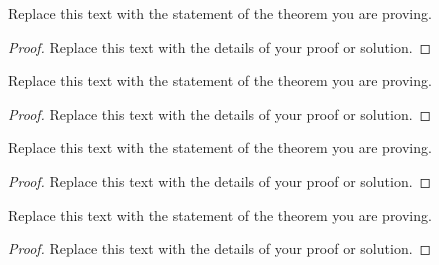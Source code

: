 \documentclass{article}
\newenvironment{problem}[2][Problem]{\begin{trivlist}
\item[\hskip \labelsep {\bfseries #1}\hskip \labelsep {\bfseries #2.}]}{\end{trivlist}}
\begin{document}

\vspace{0.25in} %

\begin{problem}{7}
Replace this text with the statement of the theorem you are proving.
\end{problem}

\begin{proof}
Replace this text with the details of your proof or solution.
\end{proof}


\vspace{0.25in} %

\begin{problem}{8}
Replace this text with the statement of the theorem you are proving.
\end{problem}

\begin{proof}
Replace this text with the details of your proof or solution.
\end{proof}


\vspace{0.25in} %

\begin{problem}{9}
Replace this text with the statement of the theorem you are proving.
\end{problem}

\begin{proof}
Replace this text with the details of your proof or solution.
\end{proof}


\vspace{0.25in} %

\begin{problem}{10}
Replace this text with the statement of the theorem you are proving.
\end{problem}

\begin{proof}
Replace this text with the details of your proof or solution.
\end{proof}


\end{document}

